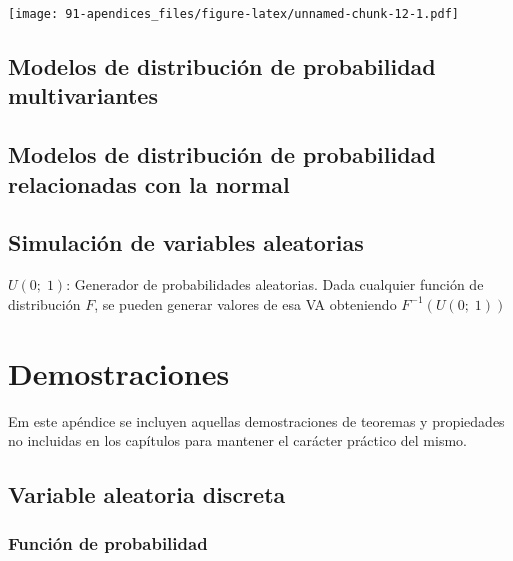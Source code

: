 \documentclass[
]{article}
\begin{document}
\texttt{[image: 91-apendices\_files/figure-latex/unnamed-chunk-12-1.pdf]}

\hypertarget{modelos-de-distribuciuxf3n-de-probabilidad-multivariantes}{%
\subsection{Modelos de distribución de probabilidad
multivariantes}\label{modelos-de-distribuciuxf3n-de-probabilidad-multivariantes}}

\hypertarget{modelos-de-distribuciuxf3n-de-probabilidad-relacionadas-con-la-normal}{%
\subsection{Modelos de distribución de probabilidad relacionadas con la
normal}\label{modelos-de-distribuciuxf3n-de-probabilidad-relacionadas-con-la-normal}}

\hypertarget{simulaciuxf3n-de-variables-aleatorias}{%
\subsection{Simulación de variables
aleatorias}\label{simulaciuxf3n-de-variables-aleatorias}}

\(U(0;\; 1)\): Generador de probabilidades aleatorias. Dada cualquier
función de distribución \(F\), se pueden generar valores de esa VA
obteniendo \(F^{-1}(U(0;\; 1))\)

\hypertarget{demostraciones}{%
\section{Demostraciones}\label{demostraciones}}

Em este apéndice se incluyen aquellas demostraciones de teoremas y
propiedades no incluidas en los capítulos para mantener el carácter
práctico del mismo.

\hypertarget{variable-aleatoria-discreta}{%
\subsection{Variable aleatoria
discreta}\label{variable-aleatoria-discreta}}

\hypertarget{funciuxf3n-de-probabilidad}{%
\subsubsection{Función de
probabilidad}\label{funciuxf3n-de-probabilidad}}
\end{document}
